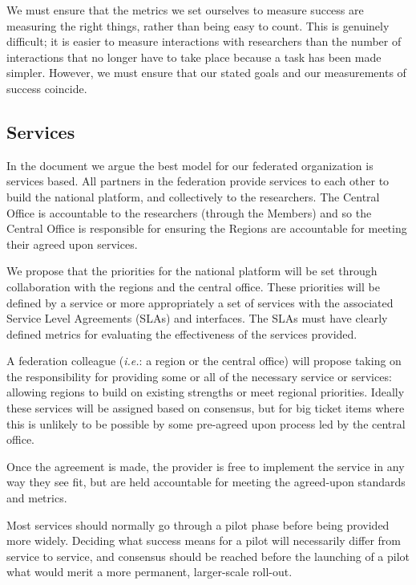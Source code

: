 \documentclass[11pt, letterpaper, twoside]{article}
\begin{document}
We must ensure that the metrics we set ourselves to measure success are
measuring the right things, rather than being easy to count.  This is
genuinely difficult; it is easier to measure interactions with
researchers than the number of interactions that no longer have to take
place because a task has been made simpler.  However, we must ensure that
our stated goals and our measurements of success coincide.

\subsection*{Services}
%

In the document we argue the best model for our federated organization
is services based. All partners in the federation provide services to
each other to build the national platform, and collectively to the
researchers. The Central Office is accountable to the researchers
(through the Members) and so the Central Office is responsible for
ensuring the Regions are accountable for meeting their agreed upon
services.

We propose that the priorities for the national platform will be set
through collaboration with the regions and the central office. These
priorities will be defined by a service or more appropriately a set of
services with the associated Service Level Agreements (SLAs) and
interfaces. The SLAs must have clearly defined metrics for evaluating
the effectiveness of the services provided.


A federation colleague (\textit{i.e.}: a region or the central office) will 
propose taking on the responsibility for providing some or all of the
necessary service or services: allowing regions to build on existing
strengths or meet regional priorities. Ideally these services will be
assigned based on consensus, but for big ticket items where this is
unlikely to be possible by some pre-agreed upon process led by the
central office.

Once the agreement is made, the provider is free to implement the
service in any way they see fit, but are held accountable for meeting
the agreed-upon standards and metrics.


Most services should normally go through a pilot phase before being
provided more widely.  Deciding what success means for a pilot will
necessarily differ from service to service, and consensus should be
reached before the launching of a pilot what would merit a more
permanent, larger-scale roll-out.
\end{document}
